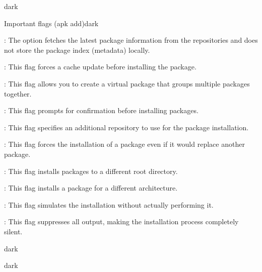 \begin{baseBoxThree}{}{dark}
    \begin{baseBoxThree}{Important flags (apk add)}{dark}
        \smallskip
        \label{apk add}
        \begin{posnexItemize}
            \item[\sA] : The option fetches the latest package information from the repositories and does not store the package index (metadata) locally.
            \item[\sA] : This flag forces a cache update before installing the package.
            \item[\sA] : This flag allows you to create a virtual package that groups multiple packages together.
            \item[\sA] : This flag prompts for confirmation before installing packages.
            \item[\sA] : This flag specifies an additional repository to use for the package installation.
            \item[\sA] : This flag forces the installation of a package even if it would replace another package.
            \item[\sA] : This flag installs packages to a different root directory.
            \item[\sA] : This flag installs a package for a different architecture.
            \item[\sA] : This flag simulates the installation without actually performing it.
            \item[\sA] : This flag suppresses all output, making the installation process completely silent.
        \end{posnexItemize}
        \smallskip
    \end{baseBoxThree}
    \smallskip
\end{baseBoxThree}

\begin{baseBoxThree}{}{dark}
    \begin{baseBoxThree}{}{dark}
        \begin{posnex}
        \end{posnex}
        \smallskip
    \end{baseBoxThree}
    \smallskip
\end{baseBoxThree}

